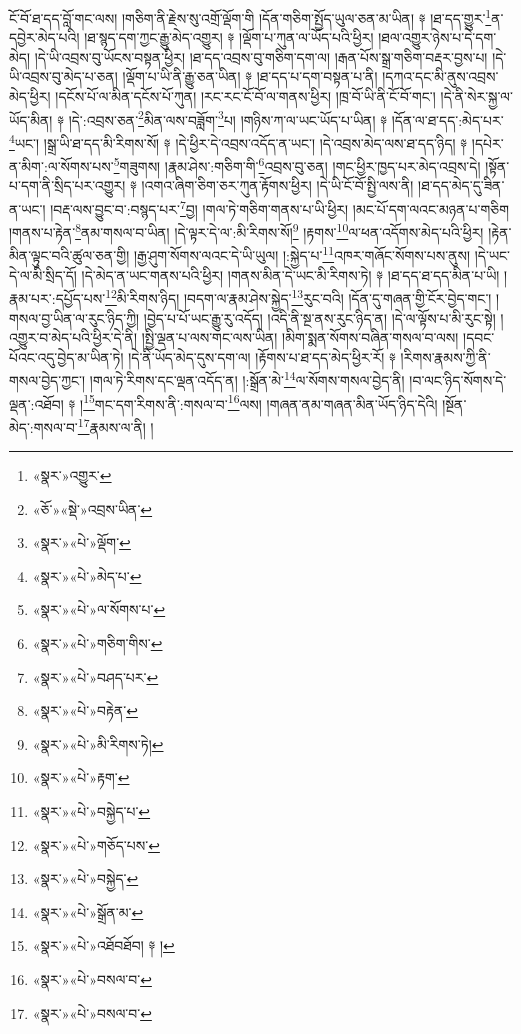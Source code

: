 ངོ་བོ་ཐ་དད་བློ་གང་ལས། །གཅིག་ནི་རྗེས་སུ་འགྲོ་ལྡོག་གི །དོན་གཅིག་སྤྱོད་ཡུལ་ཅན་མ་ཡིན། ༈ །ཐ་དད་གྱུར་\footnote{«སྣར་»འགྱུར་}ན་དབྱེར་མེད་པའི། །ཐ་སྙད་དག་ཀྱང་རྒྱུ་མེད་འགྱུར། ༈ །ལྡོག་པ་ཀུན་ལ་ཡོད་པའི་ཕྱིར། །ཐལ་འགྱུར་ཉེས་པ་དེ་དག་མེད། །དེ་ཡི་འབྲས་བུ་ཡོངས་བསྟན་ཕྱིར། །ཐ་དད་འབྲས་བུ་གཅིག་དག་ལ། །རྒན་པོས་སྒྲ་གཅིག་བརྡར་བྱས་པ། །དེ་ཡི་འབྲས་བུ་མེད་པ་ཅན། །ལྡོག་པ་ཡི་ནི་རྒྱུ་ཅན་ཡིན། ༈ །ཐ་དད་པ་དག་བསྟན་པ་ནི། །དཀའ་དང་མི་ནུས་འབྲས་མེད་ཕྱིར། །དངོས་པོ་ལ་མིན་དངོས་པོ་ཀུན། །རང་རང་ངོ་བོ་ལ་གནས་ཕྱིར། །ཁྲ་བོ་ཡི་ནི་ངོ་བོ་གང་། །དེ་ནི་སེར་སྐྱ་ལ་ཡོད་མིན། ༈ །དེ་:འབྲས་ཅན་\footnote{«ཅོ་»«སྡེ་»འབྲས་ཡིན་}མིན་ལས་བཟློག་\footnote{«སྣར་»«པེ་»ལྡོག་}པ། །གཉིས་ཀ་ལ་ཡང་ཡོད་པ་ཡིན། ༈ །དོན་ལ་ཐ་དད་:མེད་པར་\footnote{«སྣར་»«པེ་»མེད་པ་}ཡང་། །སྒྲ་ཡི་ཐ་དད་མི་རིགས་སོ། ༈ །དེ་ཕྱིར་དེ་འབྲས་འདོད་ན་ཡང་། །དེ་འབྲས་མེད་ལས་ཐ་དད་ཉིད། ༈ །དཔེར་ན་མིག་:ལ་སོགས་པས་\footnote{«སྣར་»«པེ་»ལ་སོགས་པ་}གཟུགས། །རྣམ་ཤེས་:གཅིག་གི་\footnote{«སྣར་»«པེ་»གཅིག་གིས་}འབྲས་བུ་ཅན། །གང་ཕྱིར་ཁྱད་པར་མེད་འབྲས་དེ། །སྟོན་པ་དག་ནི་སྲིད་པར་འགྱུར། ༈ །འགའ་ཞིག་ཅིག་ཅར་ཀུན་རྟོགས་ཕྱིར། །དེ་ཡི་ངོ་བོ་སྤྱི་ལས་ནི། །ཐ་དད་མེད་དུ་ཟིན་ན་ཡང་། །བརྡ་ལས་བྱུང་བ་:བསྙད་པར་\footnote{«སྣར་»«པེ་»བཤད་པར་}བྱ། །གལ་ཏེ་གཅིག་གནས་པ་ཡི་ཕྱིར། །མང་པོ་དག་ལའང་མཉན་པ་གཅིག །གནས་པ་རྟེན་\footnote{«སྣར་»«པེ་»བརྟེན་}ནམ་གསལ་བ་ཡིན། །དེ་ལྟར་དེ་ལ་:མི་རིགས་སོ།\footnote{«སྣར་»«པེ་»མི་རིགས་ཏེ།} །རྟགས་\footnote{«སྣར་»«པེ་»རྟག་}ལ་ཕན་འདོགས་མེད་པའི་ཕྱིར། །རྟེན་མིན་ལྟུང་བའི་ཚུལ་ཅན་གྱི། །རྒྱ་ཤུག་སོགས་ལའང་དེ་ཡི་ཡུལ། །:སྐྱེད་པ་\footnote{«སྣར་»«པེ་»བསྐྱེད་པ་}འཁར་གཞོང་སོགས་པས་ནུས། །དེ་ཡང་དེ་ལ་མི་སྲིད་དོ། །དེ་མེད་ན་ཡང་གནས་པའི་ཕྱིར། །གནས་མིན་དེ་ཡང་མི་རིགས་ཏེ། ༈ །ཐ་དད་ཐ་དད་མིན་པ་ཡི། །རྣམ་པར་:དཔྱོད་པས་\footnote{«སྣར་»«པེ་»གཅོད་པས་}མི་རིགས་ཉིད། །བདག་ལ་རྣམ་ཤེས་སྐྱེད་\footnote{«སྣར་»«པེ་»བསྐྱེད་}རུང་བའི། །དོན་དུ་གཞན་གྱི་ངོར་བྱེད་གང་། །གསལ་བྱ་ཡིན་ལ་རུང་ཉིད་ཀྱི། །བྱེད་པ་པོ་ཡང་རྒྱུ་རུ་འདོད། །འདི་ནི་སྔ་ནས་རུང་ཉིད་ན། །དེ་ལ་ལྟོས་པ་མི་རུང་སྟེ། །འགྱུར་བ་མེད་པའི་ཕྱིར་དེ་ནི། །སྤྱི་ལྡན་པ་ལས་གང་ལས་ཡིན། །མིག་སྨན་སོགས་བཞིན་གསལ་བ་ལས། །དབང་པོའང་འདུ་བྱེད་མ་ཡིན་ཏེ། །དེ་ནི་ཡོད་མེད་དུས་དག་ལ། །རྟོགས་པ་ཐ་དད་མེད་ཕྱིར་རོ། ༈ །རིགས་རྣམས་ཀྱི་ནི་གསལ་བྱེད་ཀྱང་། །གལ་ཏེ་རིགས་དང་ལྡན་འདོད་ན། །:སྒྲོན་མེ་\footnote{«སྣར་»«པེ་»སྒྲོན་མ་}ལ་སོགས་གསལ་བྱེད་ནི། །བ་ལང་ཉིད་སོགས་དེ་ལྡན་:འཐོབ། ༈ །\footnote{«སྣར་»«པེ་»འཐོབཐོབ། ༈ །}གང་དག་རིགས་ནི་:གསལ་བ་\footnote{«སྣར་»«པེ་»བསལ་བ་}ལས། །གཞན་ནམ་གཞན་མིན་ཡོད་ཉིད་དེའི། །སྔོན་མེད་:གསལ་བ་\footnote{«སྣར་»«པེ་»བསལ་བ་}རྣམས་ལ་ནི། །
